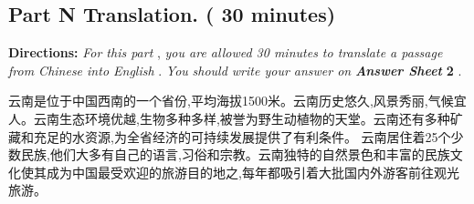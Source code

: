 \documentclass[UTF8,11pt]{ctexart}
\begin{document}
\subsection*{\textbf{Part N} \textbf{Translation.} \textbf{( 30 minutes)}}


\textbf{Directions: }\textit{For this part }, \textit{you are allowed 30 minutes to translate a passage from Chinese into English }. \textit{You} \textit{should write your answer on }\textbf{\textit{Answer Sheet }}\textbf{2} .


云南是位于中国西南的一个省份,平均海拔1500米。云南历史悠久,风景秀丽,气候宜人。云南生态环境优越,生物多种多样,被誉为野生动植物的天堂。云南还有多种矿藏和充足的水资源,为全省经济的可持续发展提供了有利条件。 云南居住着25个少数民族,他们大多有自己的语言,习俗和宗教。云南独特的自然景色和丰富的民族文化使其成为中国最受欢迎的旅游目的地之,每年都吸引着大批国内外游客前往观光旅游。
\end{document}
